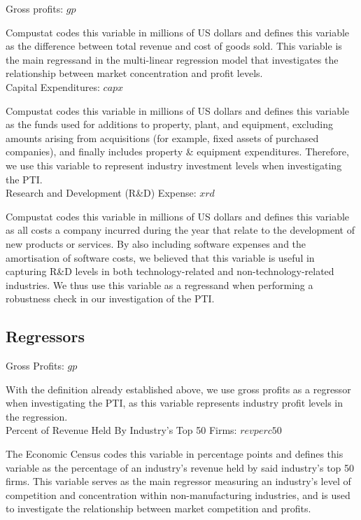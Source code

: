 \noindent Gross profits: $gp$

Compustat codes this variable in millions of US dollars and defines this variable as the difference between total revenue and cost of goods sold. This variable is the main regressand in the multi-linear regression model that investigates the relationship between market concentration and profit levels. \\

\noindent Capital Expenditures: $capx$

Compustat codes this variable in millions of US dollars and defines this variable as the funds used for additions to property, plant, and equipment, excluding amounts arising from acquisitions (for example, fixed assets of purchased companies), and finally includes property \& equipment expenditures. Therefore, we use this variable to represent industry investment levels when investigating the PTI. \\

\noindent Research and Development (R\&D) Expense: $xrd$

Compustat codes this variable in millions of US dollars and defines this variable as all costs a company incurred during the year that relate to the development of new products or services. By also including software expenses and the amortisation of software costs, we believed that this variable is useful in capturing R\&D levels in both technology-related and non-technology-related industries. We thus use this variable as a regressand when performing a robustness check in our investigation of the PTI.

\subsection{Regressors}
\label{subsec:subsec02}

\noindent Gross Profits: $gp$

With the definition already established above, we use gross profits as a regressor when investigating the PTI, as this variable represents industry profit levels in the regression. \\

\noindent Percent of Revenue Held By Industry's Top 50 Firms: $revperc50$

The Economic Census codes this variable in percentage points and defines this variable as the percentage of an industry’s revenue held by said industry’s top 50 firms. This variable serves as the main regressor measuring an industry’s level of competition and concentration within non-manufacturing industries, and is used to investigate the relationship between market competition and profits. \\

